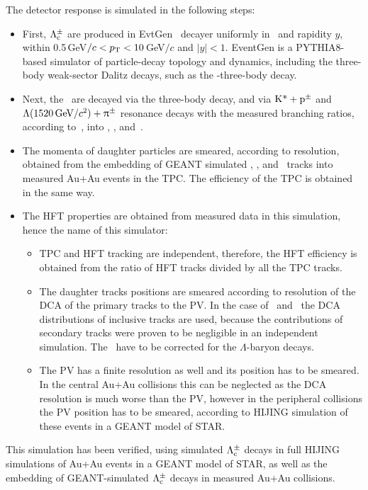 The detector response is simulated in the following steps:
\begin{itemize}
 \item First, $\Lambda_\text{c}^\pm$ are produced in EvtGen~\cite{EvtGen} decayer uniformly in \pt\ and rapidity $y$, within 0.5$\,$GeV$/c < {}p_{\mathrm{T}}{} < 10\,$GeV$/c$ and $|y| < 1$\@. EventGen is a PYTHIA8-based simulator of particle-decay topology and dynamics, including the three-body weak-sector Dalitz decays, such as the \Lambdac-three-body decay.
 \item Next, the \Lambdac\ are decayed via the three-body decay, and via $\text{K*}+\text{p}^\pm$ and $\Lambda(1520\,\text{GeV}/c^2)+\uppi^\pm$ resonance decays with the measured branching ratios, according to~\cite{PDG}, into \ppm, \Kmp, and~\pipm\@.
 \item The momenta of daughter particles are smeared, according to resolution, obtained from the embedding of GEANT simulated \ppm, \Kmp, and \pipm\ tracks into measured Au+Au events in the TPC\@. The efficiency of the TPC is obtained in the same way.
 \item The HFT properties are obtained from measured data in this simulation, hence the name of this simulator:
 \begin{itemize}
  \item TPC and HFT tracking are independent, therefore, the HFT efficiency is obtained from the ratio of HFT tracks divided by all the TPC tracks.
  \item The daughter tracks positions are smeared according to resolution of the DCA of the primary tracks to the PV\@. In the case of \pipm\ and \Kmp\ the DCA distributions of inclusive tracks are used, because the contributions of secondary tracks were proven to be negligible in an independent simulation. The \ppm\ have to be corrected for the $\Lambda$-baryon decays.
  \item The PV has a finite resolution as well and its position has to be smeared. In the central Au+Au collisions this can be neglected as the DCA resolution is much worse than the PV, however in the peripheral collisions the PV position has to be smeared, according to HIJING simulation of these events in a GEANT model of STAR\@.
 \end{itemize}
\end{itemize}

This simulation has been verified, using simulated $\Lambda_\text{c}^\pm$ decays in full HIJING simulations of Au+Au events in a GEANT model of STAR, as well as the embedding of GEANT-simulated $\Lambda_\text{c}^\pm$ decays in measured Au+Au collisions\@.


